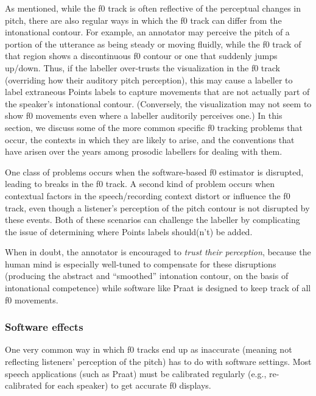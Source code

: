 As mentioned, while the f0 track is often reflective of the perceptual changes in pitch, there are also regular ways in which the f0 track can differ from the intonational contour. For example, an annotator may perceive the pitch of a portion of the utterance as being steady or moving fluidly, while the f0 track of that region shows a discontinuous f0 contour or one that suddenly jumps up\slash down. Thus, if the labeller over-trusts the visualization in the f0 track (overriding how their auditory pitch perception), this may cause a labeller to label extraneous Points labels to capture movements that are not actually part of the speaker’s intonational contour. (Conversely, the visualization may not seem to show f0 movements even where a labeller auditorily perceives one.) In this section, we discuss some of the more common specific f0 tracking problems that occur, the contexts in which they are likely to arise, and the conventions that have arisen over the years among prosodic labellers for dealing with them.

One class of problems occurs when the software-based f0 estimator is disrupted, leading to breaks in the f0 track. A second kind of problem occurs when contextual factors in the speech\slash recording context distort or influence the f0 track, even though a listener’s perception of the pitch contour is not disrupted by these events. Both of these scenarios can challenge the labeller by complicating the issue of determining where Points labels should(n’t) be added.

When in doubt, the annotator is encouraged to \emph{trust their perception}, because the human mind is especially well-tuned to compensate for these disruptions (producing the abstract and “smoothed” intonation contour, on the basis of intonational competence) while software like Praat is designed to keep track of all f0 movements.

\subsubsection{Software effects}\label{sec:software-effects}

One very common way in which f0 tracks end up as inaccurate (meaning not reflecting listeners’ perception of the pitch) has to do with software settings. Most speech applications (such as Praat) must be calibrated regularly (e.g., re-calibrated for each speaker) to get accurate f0 displays.

